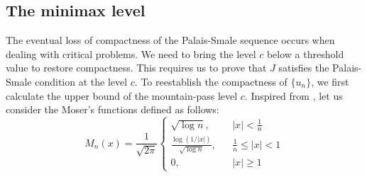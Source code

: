 \documentclass[11pt]{amsart}
\numberwithin{equation}{section}
\newcommand{\1}{\frac{1}{2}}
\begin{document}
	\subsection{The minimax level} The eventual loss of compactness of the Palais-Smale sequence occurs when dealing with critical problems. We need to bring the level $c$ below a threshold value to restore compactness. This requires us to prove that $J$ satisfies the Palais-Smale condition at the level $c$. To reestablish the compactness of $\{u_n\}$, we first calculate the upper bound of the mountain-pass level $c$. Inspired from \cite{ Adimurthi1, Cassani, Figueiredo}, let us consider the Moser's functions defined as follows:
	\begin{equation}
		\nonumber
		M_n(x) = \frac{1}{\sqrt{2\pi}}
		\left\{
		\begin{aligned}
			\sqrt{\log{n}}, && |x|< \frac{1}{n}\\
			\frac{\log{(1/|x|)}}{\sqrt{\log{n}}},  &&\frac{1}{n} \leq |x| < 1\\
			0, && |x| \geq 1
		\end{aligned}
		\right.
	\end{equation} 
	
\end{document}
